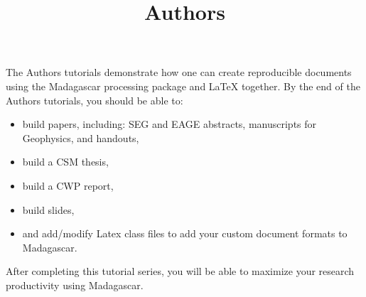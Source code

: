 \title{Authors}
The Authors tutorials demonstrate how one can create reproducible documents using the Madagascar processing package and LaTeX together.  By the end of the Authors tutorials, you should be able to:
\begin{itemize}
	\item build papers, including: SEG and EAGE abstracts, manuscripts for Geophysics, and handouts,
	\item build a CSM thesis,
    \item build a CWP report,
    \item build slides,
    \item and add/modify Latex class files to add your custom document formats to Madagascar.
\end{itemize}
After completing this tutorial series, you will be able to maximize your research productivity using Madagascar.


%
%
%
%
%
%
%
